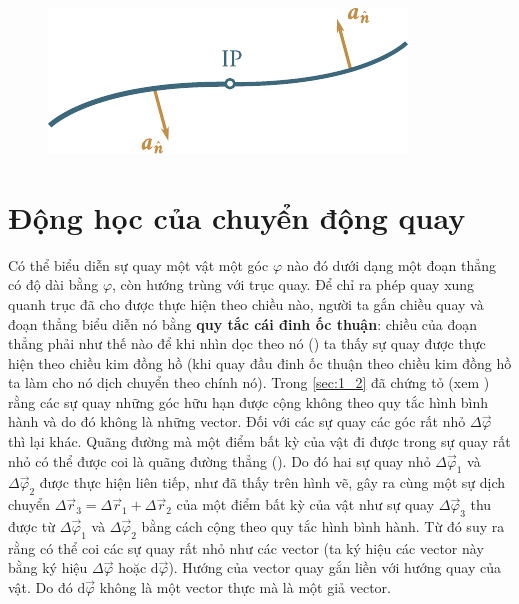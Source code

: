 \begin{figure}[!htb]
	\begin{center}
		\includegraphics[scale=0.95]{figures/ch_01/fig_1_28.pdf}
		\caption[]{}
		\label{fig:1_28}
	\end{center}
\end{figure}

\section{Động học của chuyển động quay}\label{sec:1_5}

Có thể biểu diễn sự quay một vật một góc $\varphi$ nào đó dưới dạng một đoạn thẳng có độ dài bằng $\varphi$, còn hướng trùng với trục quay. Để chỉ ra phép quay xung quanh trục đã cho được thực hiện theo chiều nào, người ta gắn chiều quay và đoạn thẳng biểu diễn nó bằng \textbf{quy tắc cái đinh ốc thuận}: chiều của đoạn thẳng phải như thế nào để khi nhìn dọc theo nó () ta thấy sự quay được thực hiện theo chiều kim đồng hồ (khi quay đầu đinh ốc thuận theo chiều kim đồng hồ ta làm cho nó dịch chuyển theo chính nó). Trong \ref{sec:1_2} đã chứng tỏ (xem ) rằng các sự quay những góc hữu hạn được cộng không theo quy tắc hình bình hành và do đó không là những vector. Đối với các sự quay các góc rất nhỏ $\Delta\vec{\varphi}$ thì lại khác. Quãng đường mà một điểm bất kỳ của vật đi được trong sự quay rất nhỏ có thể được coi là quãng đường thẳng (). Do đó hai sự quay nhỏ $\Delta\vec{\varphi}_1$ và $\Delta\vec{\varphi}_2$ được thực hiện liên tiếp, như đã thấy trên hình vẽ, gây ra cùng một sự dịch chuyển $\Delta\vec{r}_3=\Delta\vec{r}_1+\Delta\vec{r}_2$ của một điểm bất kỳ của vật như sự quay $\Delta\vec{\varphi}_3$ thu được từ $\Delta\vec{\varphi}_1$ và $\Delta\vec{\varphi}_2$ bằng cách cộng theo quy tắc hình bình hành. Từ đó suy ra rằng có thể coi các sự quay rất nhỏ như các vector (ta ký hiệu các vector này bằng ký hiệu $\Delta\vec{\varphi}$ hoặc $\mathrm{d}\vec{\varphi}$). Hướng của vector quay gắn liền với hướng quay của vật. Do đó $\mathrm{d}\vec{\varphi}$ không là một vector thực mà là một giả vector.

